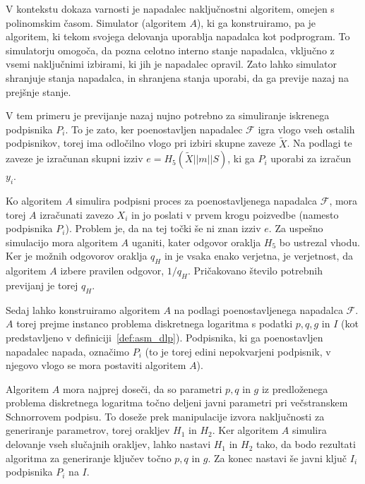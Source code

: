 \documentclass[isrm2, tisk]{fmfdelo}
\begin{document}
\begin{opomba}
    V kontekstu dokaza varnosti je napadalec naključnostni algoritem, omejen s polinomskim časom.
    Simulator (algoritem $A$), ki ga konstruiramo, pa je algoritem, ki tekom svojega delovanja
    uporablja napadalca kot podprogram. To simulatorju omogoča, da pozna celotno interno stanje
    napadalca, vključno z vsemi naključnimi izbirami, ki jih je napadalec opravil. Zato lahko
    simulator shranjuje stanja napadalca, in shranjena stanja uporabi, da ga previje nazaj na
    prejšnje stanje.
\end{opomba}

V tem primeru je previjanje nazaj nujno potrebno za simuliranje iskrenega podpisnika $P_i$. To je zato,
ker poenostavljen napadalec $\mathcal{F}$ igra vlogo vseh ostalih podpisnikov, torej ima odločilno
vlogo pri izbiri skupne zaveze $\tilde{X}$. Na podlagi te zaveze je izračunan skupni izziv 
$e = H_5(\tilde{X} || m || S)$, ki ga $P_i$ uporabi za izračun $y_i$. 

Ko algoritem $A$ simulira podpisni proces za poenostavljenega napadalca $\mathcal{F}$, mora torej
$A$ izračunati zavezo $X_i$ in jo poslati v prvem krogu poizvedbe (namesto podpisnika $P_i$). Problem
je, da na tej točki še ni znan izziv $e$. Za uspešno simulacijo mora algoritem $A$ uganiti, kater
odgovor oraklja $H_5$ bo ustrezal vhodu. Ker je možnih odgovorov oraklja $q_H$ in je vsaka enako
verjetna, je verjetnost, da algoritem $A$ izbere pravilen odgovor, $1/q_H$. Pričakovano število
potrebnih previjanj je torej $q_H$.

Sedaj lahko konstruiramo algoritem $A$ na podlagi poenostavljenega napadalca $\mathcal{F}$. $A$ torej
prejme instanco problema diskretnega logaritma s podatki $p, q, g$ in $I$ (kot predstavljeno v 
definiciji~\ref{def:asm_dlp}). Podpisnika, ki ga poenostavljen napadalec napada, označimo $P_i$
(to je torej edini nepokvarjeni podpisnik, v njegovo vlogo se mora postaviti algoritem $A$).

Algoritem $A$ mora najprej doseči, da so parametri $p, q$ in $g$ iz predloženega problema diskretnega
logaritma točno deljeni javni parametri pri večstranskem Schnorrovem podpisu. To doseže prek
manipulacije izvora naključnosti za generiranje parametrov, torej orakljev $H_1$ in $H_2$. Ker
algoritem $A$ simulira delovanje vseh slučajnih orakljev, lahko nastavi $H_1$ in $H_2$ tako, da
bodo rezultati algoritma za generiranje ključev točno $p, q$ in $g$. Za konec nastavi še javni
ključ $I_i$ podpisnika $P_i$ na $I$.
\end{document}
